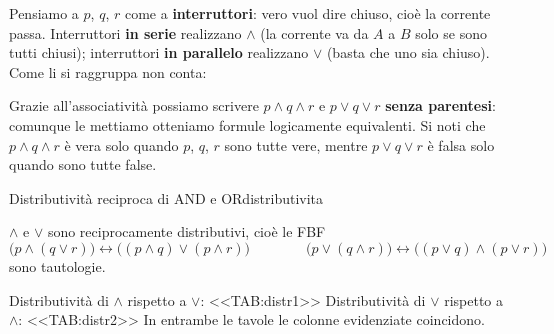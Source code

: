 \begin{spiegazione}
    Pensiamo a $p$, $q$, $r$ come a \textbf{interruttori}: vero vuol dire chiuso, cioè la corrente passa. Interruttori \textbf{in serie} realizzano $\wedge$ (la corrente
    va da $A$ a $B$ solo se sono tutti chiusi); interruttori \textbf{in parallelo} realizzano $\vee$ (basta che uno sia chiuso). Come li si raggruppa non conta:
    \begin{center}
    \end{center}
\end{spiegazione}


Grazie all'associatività possiamo scrivere $p \wedge q \wedge r$ e $p \vee q \vee r$ \textbf{senza parentesi}:
comunque le mettiamo otteniamo formule logicamente equivalenti. Si noti che $p \wedge q \wedge r$ è vera solo
quando $p$, $q$, $r$ sono tutte vere, mentre $p \vee q \vee r$ è falsa solo quando sono tutte false.

\begin{concetto}
\begin{Proposizione}{Distributività reciproca di AND e OR}{distributivita}
    \begin{prerequisiti}
    \end{prerequisiti}
    $\wedge$ e $\vee$ sono reciprocamente distributivi, cioè le FBF
    \[ \big(p \wedge (q \vee r)\big) \leftrightarrow \big((p \wedge q) \vee (p \wedge r)\big) \qquad\qquad
       \big(p \vee (q \wedge r)\big) \leftrightarrow \big((p \vee q) \wedge (p \vee r)\big) \]
    sono tautologie.
\end{Proposizione}

\begin{dimostrazione}
    Distributività di $\wedge$ rispetto a $\vee$:
    <<TAB:distr1>>
    Distributività di $\vee$ rispetto a $\wedge$:
    <<TAB:distr2>>
    In entrambe le tavole le colonne evidenziate coincidono.
\end{dimostrazione}
\end{concetto}


